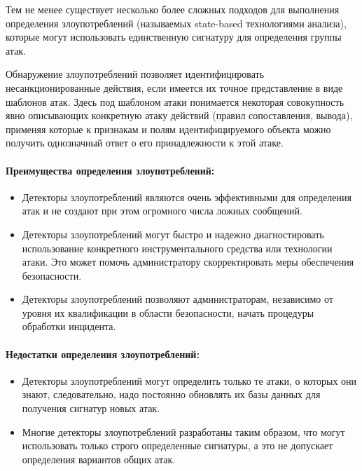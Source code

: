 Тем не менее существует несколько более сложных подходов для выполнения определения злоупотреблений (называемых state-based технологиями анализа), которые могут использовать единственную сигнатуру для определения группы атак.


Обнаружение злоупотреблений позволяет идентифицировать несанкционированные действия, если имеется их точное представление в виде шаблонов атак. Здесь под шаблоном атаки понимается некоторая совокупность явно описывающих конкретную атаку действий (правил сопоставления, вывода), применяя которые к признакам и полям идентифицируемого объекта можно получить однозначный ответ о его принадлежности к этой атаке. \autocite{IDSBranitsky}

\paragraph*{Преимущества определения злоупотреблений:}

\begin{itemize}
	\item Детекторы злоупотреблений являются очень эффективными для определения атак и не создают при этом огромного числа ложных сообщений.

	\item Детекторы злоупотреблений могут быстро и надежно диагностировать использование конкретного инструментального средства или технологии атаки. Это может помочь администратору скорректировать меры обеспечения безопасности.
	
	\item Детекторы злоупотреблений позволяют администраторам, независимо от уровня их квалификации в области безопасности, начать процедуры обработки инцидента.
\end{itemize}


\paragraph*{Недостатки определения злоупотреблений:}

\begin{itemize}
	\item Детекторы злоупотреблений могут определить только те атаки, о которых они знают, следовательно, надо постоянно обновлять их базы данных для получения сигнатур новых атак.

	\item Многие детекторы злоупотреблений разработаны таким образом, что могут использовать только строго определенные сигнатуры, а это не допускает определения вариантов общих атак.
\end{itemize}

